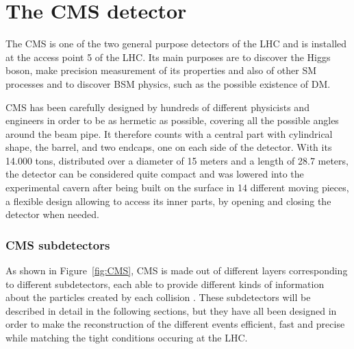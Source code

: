 \documentclass[a4paper, 10pt, openright]{report}
\begin{document}
\section{The \ac{CMS} detector} \label{section:CMS}

The \acf{CMS} is one of the two general purpose detectors of the \ac{LHC} and is installed at the access point 5 of the \ac{LHC}. Its main purposes are to discover the Higgs boson, make precision measurement of its properties and also of other \ac{SM} processes and to discover \ac{BSM} physics, such as the possible existence of \ac{DM}. 

\ac{CMS} has been carefully designed by hundreds of different physicists and engineers in order to be as hermetic as possible, covering all the possible angles around the beam pipe. It therefore counts with a central part with cylindrical shape, the barrel, and two endcaps, one on each side of the detector. With its 14.000 tons, distributed over a diameter of 15 meters and a length of 28.7 meters, the detector can be considered quite compact and was lowered into the experimental cavern after being built on the surface in 14 different moving pieces, a flexible design allowing to access its inner parts, by opening and closing the detector when needed.

\subsubsection*{\ac{CMS} subdetectors}

As shown in Figure~\ref{fig:CMS}, \ac{CMS} is made out of different layers corresponding to different subdetectors, each able to provide different kinds of information about the particles created by each collision \cite{CMSDescription}. These subdetectors will be described in detail in the following sections, but they have all been designed in order to make the reconstruction of the different events efficient, fast and precise while matching the tight conditions occuring at the \ac{LHC}.
\end{document}
